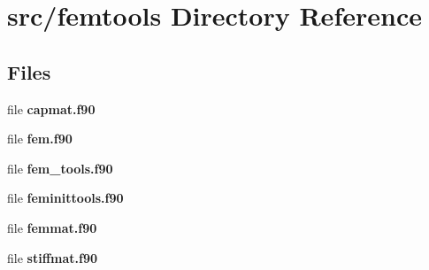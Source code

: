 \section{src/femtools Directory Reference}
\label{dir_44f4b5922a7be9b6ec09df53260b9021}
\subsection*{Files}
\begin{DoxyCompactItemize}
\item 
file {\bf capmat.\+f90}
\item 
file {\bf fem.\+f90}
\item 
file {\bf fem\+\_\+tools.\+f90}
\item 
file {\bf feminittools.\+f90}
\item 
file {\bf femmat.\+f90}
\item 
file {\bf stiffmat.\+f90}
\end{DoxyCompactItemize}
